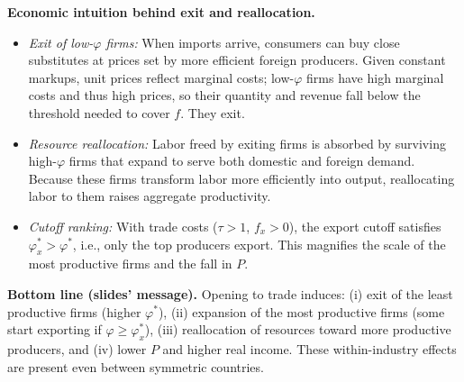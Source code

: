 \begin{solution}
\bigskip
	\textbf{Economic intuition behind exit and reallocation.}
\begin{itemize}
	\item \emph{Exit of low-$\varphi$ firms:} When imports arrive, consumers can buy close substitutes at prices set by more efficient foreign producers. Given constant markups, unit prices reflect marginal costs; low-$\varphi$ firms have high marginal costs and thus high prices, so their quantity and revenue fall below the threshold needed to cover $f$. They exit.
	\item \emph{Resource reallocation:} Labor freed by exiting firms is absorbed by surviving high-$\varphi$ firms that expand to serve both domestic and foreign demand. Because these firms transform labor more efficiently into output, reallocating labor to them raises aggregate productivity.
	\item \emph{Cutoff ranking:} With trade costs ($\tau>1$, $f_x>0$), the export cutoff satisfies $\varphi_x^*>\varphi^*$, i.e., only the top producers export. This magnifies the scale of the most productive firms and the fall in $P$.
\end{itemize}

\bigskip
	\textbf{Bottom line (slides’ message).}
Opening to trade induces: (i) exit of the least productive firms (higher $\varphi^*$), (ii) expansion of the most productive firms (some start exporting if $\varphi\ge\varphi_x^*$), (iii) reallocation of resources toward more productive producers, and (iv) lower $P$ and higher real income. These within-industry effects are present even between symmetric countries.

\medskip
\noindent{}
\end{solution}
